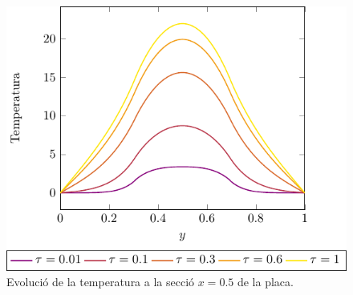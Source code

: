 \documentclass[10pt,a4paper]{article}
\theoremstyle{definition}
\theoremstyle{remark}
\begin{document}
\begin{figure}[ht]
  \centering
  \includegraphics[width=0.5\linewidth]{Images/graphic.pdf}
  \caption{Evolució de la temperatura a la secció $x=0.5$ de la placa.}
\end{figure}
\end{document}
